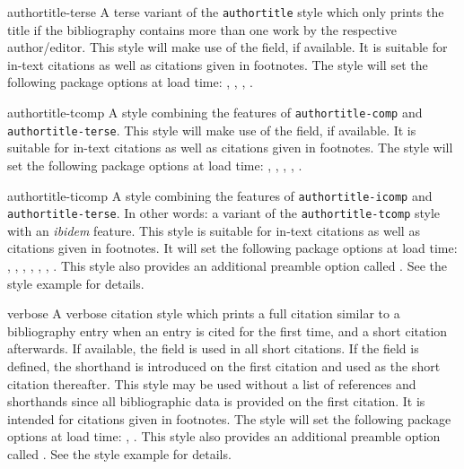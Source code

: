 \documentclass{ltxdockit}[2011/03/25]
\begin{document}
\begin{marglist}
\item[authortitle-terse]
A terse variant of the \texttt{authortitle} style which only prints the title if the bibliography contains more than one work by the respective author\slash editor. This style will make use of the  field, if available. It is suitable for in-text citations as well as citations given in footnotes. The style will set the following package options at load time: , , , .

\item[authortitle-tcomp]
A style combining the features of \texttt{authortitle-comp} and \texttt{authortitle-terse}. This style will make use of the  field, if available. It is suitable for in-text citations as well as citations given in footnotes. The style will set the following package options at load time: , , , , .

\item[authortitle-ticomp]
A style combining the features of \texttt{authortitle-icomp} and \texttt{authortitle-terse}. In other words: a variant of the \texttt{authortitle-tcomp} style with an \emph{ibidem} feature. This style is suitable for in-text citations as well as citations given in footnotes. It will set the following package options at load time: , , , , , , . This style also provides an additional preamble option called . See the style example for details.

\item[verbose]
A verbose citation style which prints a full citation similar to a bibliography entry when an entry is cited for the first time, and a short citation afterwards. If available, the  field is used in all short citations. If the  field is defined, the shorthand is introduced on the first citation and used as the short citation thereafter. This style may be used without a list of references and shorthands since all bibliographic data is provided on the first citation. It is intended for citations given in footnotes. The style will set the following package options at load time: , . This style also provides an additional preamble option called . See the style example for details.


\end{marglist}
\end{document}
